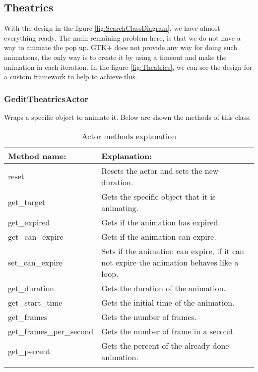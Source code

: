\newpage
{}

\newpage
\subsection{Theatrics}\label{sec:Theatrics}

With the design in the figure \ref{fig:SearchClassDiagram}, we have almost everything ready. The main remaining problem here, is that we do not have a way to animate the pop up. GTK+ does not provide any way for doing such animations, the only way is to create it by using a timeout and make the animation in each iteration. In the figure \ref{fig:Theatrics}, we can see the design for a custom framework to help to achieve this.


\subsubsection{GeditTheatricsActor}

Wraps a specific object to animate it. Below are shown the methods of this class.

\begin{table}[H]
  \begin{center}
    \begin{tabularx}{\textwidth}{|X|X|}
      \firsthline
      \textbf{Method name:} & \textbf{Explanation:} \\
      \hline
      reset & Resets the actor and sets the new duration. \\
      \hline
      get\_target & Gets the specific object that it is animating. \\
      \hline
      get\_expired & Gets if the animation has expired. \\
      \hline
      get\_can\_expire & Gets if the animation can expire. \\
      \hline
      set\_can\_expire & Sets if the animation can expire, if it can not expire the animation behaves like a loop. \\
      \hline
      get\_duration & Gets the duration of the animation. \\
      \hline
      get\_start\_time & Gets the initial time of the animation. \\
      \hline
      get\_frames & Gets the number of frames. \\
      \hline
      get\_frames\_per\_second & Gets the number of frame in a second. \\
      \hline
      get\_percent & Gets the percent of the already done animation. \\
      \lasthline
    \end{tabularx}
    \caption{Actor methods explanation}
  \end{center}
\end{table}

